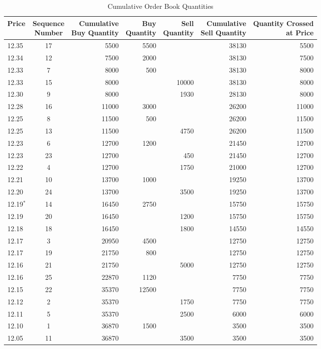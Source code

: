 	\begin{table}[!ht]
   	\centering
   	\caption{Cumulative Order Book Quantities\label{tab:openAuct3}}
   	\begin{tabular}{lcrrrrr}
	Price & \makecell{Sequence \\ Number} & \makecell{Cumulative \\ Buy Quantity} & \makecell{Buy \\ Quantity} & \makecell{Sell \\ Quantity} & \makecell{Cumulative \\ Sell Quantity} & \makecell{Quantity Crossed \\ at Price} \\ \hline
	12.35 &  17 & 5500  & 5500 &  & 38130 & 5500 \\
	12.34 & 12 & 7500 & 2000 & & 38130 & 7500  \\	
	12.33 & 7  &  8000 & 500 &  & 38130 & 8000 \\	
	12.33 &  15 & 8000 &  & 10000 & 38130 & 8000 \\	
	12.30 & 9 & 8000 & & 1930 & 28130 & 8000 \\					
	12.28 &  16 & 11000  & 3000 &  & 26200 & 11000 \\	
	12.25 & 8 &  11500 & 500 & & 26200 & 11500 \\	
	12.25 & 13 & 11500 & & 4750 & 26200 & 11500 \\	
	12.23 & 6 &  12700 & 1200 & & 21450 & 12700 \\		
	12.23 &  23 & 12700 & & 450 & 21450 & 12700 \\
	12.22 & 4  & 12700 & & 1750 & 21000 & 12700 \\	
	12.21  & 10 & 13700  & 1000 & & 19250 & 13700 \\		
	12.20 &  24 & 13700 & & 3500 & 19250 & 13700 \\	
	12.19$^*$ &  14 & 16450  & 2750 &  & 15750 & 15750 \\		
	12.19 &  20 & 16450 & & 1200 & 15750 & 15750 \\
	12.18 &  18 & 16450 & & 1800 & 14550 & 14550 \\
	12.17 & 3  &  20950 & 4500  & & 12750 & 12750 \\		
	12.17 &  19 & 21750 & 800 & & 12750 & 12750 \\			
	12.16 &  21 & 21750 & & 5000 & 12750 & 12750 \\
	12.16 &  25 & 22870 & 1120 & & 7750 & 7750 \\		
	12.15  &  22 & 35370 & 12500 & & 7750 & 7750 \\
	12.12  & 2  & 35370 & & 1750 & 7750 & 7750 \\		
	12.11  & 5  & 35370 & & 2500 & 6000 & 6000 \\				
	12.10 & 1  &  36870 & 1500 & & 3500 & 3500 \\
	12.05  & 11 & 36870 & & 3500 & 3500 & 3500 	
   	\end{tabular}
	\end{table}


